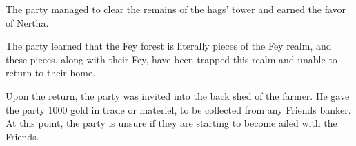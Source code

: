 The party managed to clear the remains of the hags' tower and earned the favor of Nertha.

The party learned that the Fey forest is literally pieces of the Fey realm, and these pieces, along with their Fey, have been trapped this realm and unable to return to their home.

Upon the return, the party was invited into the back shed of the farmer.
He gave the party 1000 gold in trade or materiel, to be collected from any Friends banker.
At this point, the party is unsure if they are starting to become ailed with the Friends.
